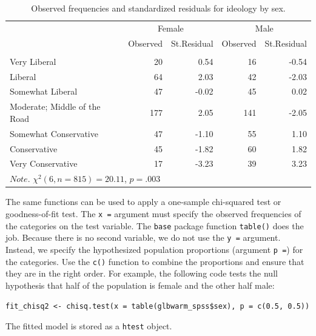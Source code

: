 \documentclass[doc,floatsintext]{apa6}
\begin{document}
\begin{table}[!h]

\caption{\label{tab:chisqtable}Observed frequencies and standardized residuals 
                   for ideology by sex.}
\centering
\begin{tabular}[t]{lrrrr}
\toprule
\multicolumn{1}{c}{} & \multicolumn{2}{c}{Female} & \multicolumn{2}{c}{Male} \\
\cmidrule(l{3pt}r{3pt}){2-3} \cmidrule(l{3pt}r{3pt}){4-5}
\multicolumn{1}{c}{} & \multicolumn{1}{c}{Observed} & \multicolumn{1}{c}{St.Residual} & \multicolumn{1}{c}{Observed} & \multicolumn{1}{c}{St.Residual} \\
\cmidrule(l{3pt}r{3pt}){2-2} \cmidrule(l{3pt}r{3pt}){3-3} \cmidrule(l{3pt}r{3pt}){4-4} \cmidrule(l{3pt}r{3pt}){5-5}
  &  &  &  & \\
\midrule
Very Liberal & 20 & 0.54 & 16 & -0.54\\
Liberal & 64 & 2.03 & 42 & -2.03\\
Somewhat Liberal & 47 & -0.02 & 45 & 0.02\\
Moderate; Middle of the Road & 177 & 2.05 & 141 & -2.05\\
Somewhat Conservative & 47 & -1.10 & 55 & 1.10\\
\addlinespace
Conservative & 45 & -1.82 & 60 & 1.82\\
Very Conservative & 17 & -3.23 & 39 & 3.23\\
\bottomrule
\multicolumn{5}{l}{$Note$. $\chi^{2} (6, n = 815) = 20.11$, $p = .003$}\\
\end{tabular}
\end{table}

The same functions can be used to apply a one-sample chi-squared test or
goodness-of-fit test. The \texttt{x\ =} argument must specify the
observed frequencies of the categories on the test variable. The
\texttt{base} package function \texttt{table()} does the job. Because
there is no second variable, we do not use the \texttt{y\ =} argument.
Instead, we specify the hypothesized population proportions (argument
\texttt{p\ =}) for the categories. Use the \texttt{c()} function to
combine the proportions and ensure that they are in the right order. For
example, the following code tests the null hypothesis that half of the
population is female and the other half male:

\texttt{fit\_chisq2\ \textless{}-\ chisq.test(x\ =\ table(glbwarm\_spss\$sex),\ p\ =\ c(0.5,\ 0.5))}

The fitted model is stored as a \texttt{htest} object.
\end{document}
